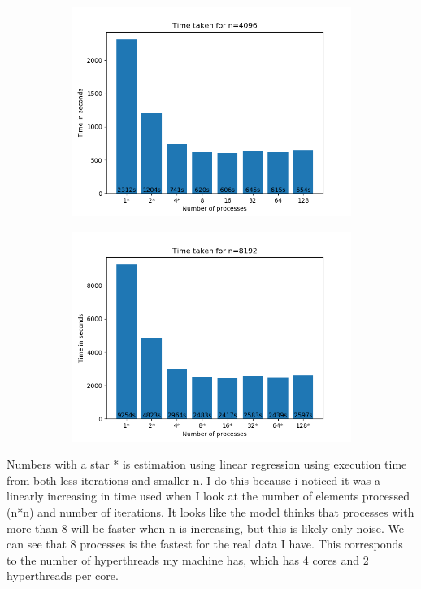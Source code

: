 \documentclass[a4paper]{extarticle}
\begin{document}
\begin{figure}[h!]
\centering
\begin{subfigure}{.5\textwidth}
  \centering
  \includegraphics[width=1.1\linewidth]{../Plot/bar4096.png}
\end{subfigure}%
\begin{subfigure}{.5\textwidth}
  \centering
  \includegraphics[width=1.1\linewidth]{../Plot/bar8192.png}
\end{subfigure}
\end{figure}

Numbers with a star * is estimation using linear regression using execution time from both less iterations and smaller n. I do this because i noticed it was a linearly increasing in time used when I look at the number of elements processed (n*n) and number of iterations. It looks like the model thinks that processes with more than 8 will be faster when n is increasing, but this is likely only noise. We can see that 8 processes is the fastest for the real data I have. This corresponds to the number of hyperthreads my machine has, which has 4 cores and 2 hyperthreads per core.
\end{document}
